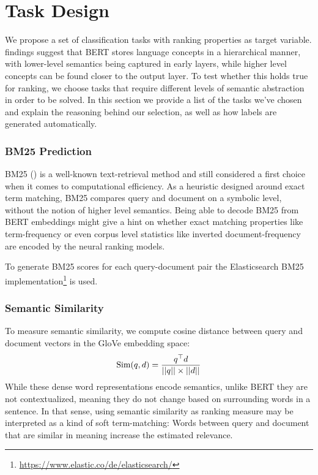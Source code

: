 \section{Task Design}
\label{sec:tasks}
We propose a set of classification tasks with ranking properties as target variable. \cite{tenney-etal-2019-bert} findings suggest that BERT stores language concepts in a hierarchical manner, with lower-level semantics being captured in early layers, while higher level concepts can be found closer to the output layer. To test whether this holds true for ranking, we choose tasks that require different levels of semantic abstraction in order to be solved. In this section we provide a list of the tasks we've chosen and explain the reasoning behind our selection, as well as how labels are generated automatically.

\subsubsection{BM25 Prediction}
BM25 () is a well-known text-retrieval method and still considered a first choice when it comes to computational efficiency. As a heuristic designed around exact term matching, BM25 compares query and document on a symbolic level, without the notion of higher level semantics. Being able to decode BM25 from BERT embeddings might give a hint on whether exact matching properties like term-frequency or even corpus level statistics like inverted document-frequency are encoded by the neural ranking models.

To generate BM25 scores for each query-document pair the Elasticsearch BM25 implementation\footnote{\url{https://www.elastic.co/de/elasticsearch/}} is used.

\subsubsection{Semantic Similarity}
To measure semantic similarity, we compute cosine distance between query and document vectors in the GloVe\cite{pennington2014glove} embedding space:
\begin{equation}
    \label{eq:sem_sim}
    \text{Sim}(q, d) = \frac{q^\top d}{||q|| \times ||d||}
\end{equation}
While these dense word representations encode semantics, unlike BERT they are not contextualized, meaning they do not change based on surrounding words in a sentence. In that sense, using semantic similarity as ranking measure may be interpreted as a kind of soft term-matching: Words between query and document that are similar in meaning increase the estimated relevance.

